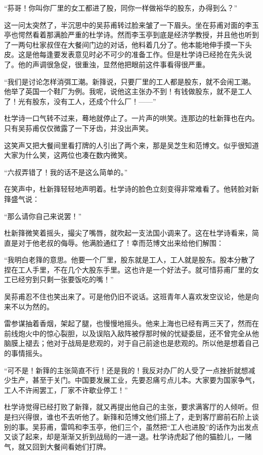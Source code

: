 \par “荪哥！你叫你厂里的女工都进了股，同你一样做裕华的股东，办得到么？”
\par 这一问太突然了，半沉思中的吴荪甫转过脸来皱了一下眉头。坐在荪甫对面的李玉亭也愕然看着那满脸严重的杜学诗。然而李玉亭到底是经济学教授，并且他也听到了一两句杜家叔侄在大餐间门边的对话，他料着几分了。他本能地伸手摸一下头皮。这是他每逢要发表意见时必不可少的准备工作。但是杜学诗已经抢在先头说了。他的声调很急促，很重浊，显然他把眼前这件事看得很严重。
\par “我们是讨论怎样消弭工潮。新箨说，只要厂里的工人都是股东，就不会闹工潮。他举了英国一个鞋厂为例。我呢，说他这主张办不到！有钱做股东，就不是工人了！光有股东，没有工人，还成个什么厂！——”
\par 杜学诗一口气转不过来，蓦地就停止了。一片声的哄笑。连那边的杜新箨也在内。只有吴荪甫仅仅微露了一下牙齿，并没出声笑。
\par 这笑声又把大餐间里看打牌的人引出了两个来，那是吴芝生和范博文。似乎很知道大家为什么笑，这两位也凑在数内微笑。
\par “六叔弄错了！我的话不是这么简单的。”
\par 在笑声中，杜新箨轻轻地声明着。杜学诗的脸色立刻变得非常难看了。他转脸对新箨盛气说：
\par “那么请你自己来说罢！”
\par 杜新箨微笑着摇头，撮尖了嘴唇，就吹起一支法国小调来了。这在杜学诗看来，简直是对于他老叔的侮辱。他满脸通红了！幸而范博文出来给他们解围：
\par “我明白老箨的意思。他要一个厂里，股东就是工人，工人就是股东。股本分散了捏在工人手里，不在几个大股东手里。这也许是一个好法子。就可惜荪甫厂里的女工已经穷到只剩一张要饭吃的嘴！”
\par 吴荪甫忍不住也笑出来了。可是他仍旧不说话。这班青年人喜欢发空议论，他是向来不以为然的。
\par 雷参谋抽着香烟，架起了腿，也慢慢地摇头。他来上海也已经有两三天了，然而在前线炮火中的惊心裂胆，以及误陷入敌阵被俘那时候的忧疑委屈，还不曾完全从他脑膜上褪去；他对于战局是悲观的，对于自己前途也是悲观的。所以他是想着自己的事情摇头。
\par “可不是！新箨的主张简直不行！还是我的！我反对办厂的人受了一点挫折就想减少生产，甚至于关门。中国要发展工业，先要忍痛亏点儿本。大家要为国家争气，工人不许闹罢工，厂家不许歇业停工！”
\par 杜学诗觉得已经打败了新箨，就又再提出他自己的主张，要求满客厅的人倾听。但是扫兴得很，谁也不去听他了。新箨和范博文他们搭上了，走到客厅廊前石阶上谈别的事。吴荪甫，雷鸣和李玉亭，他们三个，虽然把“工人也进股”的话作为出发点又谈了起来，却是渐渐又折到战局的一进一退。杜学诗虎起了他的猫脸儿，一赌气，就又回到大餐间看她们打牌。
